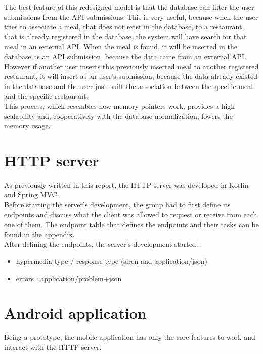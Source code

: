 The best feature of this redesigned model is that the database can filter the user submissions from the API submissions. This is very
useful, because when the user tries to associate a meal, that does not exist in the database, to a restaurant, that is already registered
in the database, the system will have search for that meal in an external API. When the meal is found, it will be inserted in the database
as an API submission, because the data came from an external API.\\

However if another user inserts this previously inserted meal to another registered restaurant, it will insert as an user's submission, because
the data already existed in the database and the user just built the association between the specific meal and the specific restaurant.\\

This process, which resembles how memory pointers work, provides a high scalability and, cooperatively with the database normalization, lowers the memory usage.

\section{HTTP server}

As previously written in this report, the HTTP server was developed in Kotlin and Spring MVC.\\

Before starting the server's development, the group had to first define its endpoints and discuss what the client was allowed to request or receive from each one of them.
The endpoint table that defines the endpoints and their tasks can be found in the appendix.\\

After defining the endpoints, the server's development started...

\begin{itemize}
    \item hypermedia type / response type (siren and application/json)
    \item errors : application/problem+json
\end{itemize}

\section{Android application}

Being a prototype, the mobile application has only the core features to work and interact with the HTTP server.

